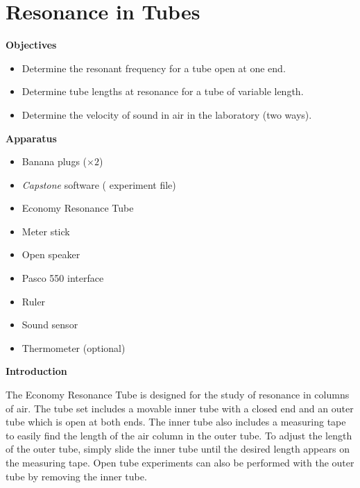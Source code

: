 \section{Resonance in Tubes} 



\makelabheader %

\bigskip

\textbf{Objectives}
\begin{itemize}[nosep]
\item Determine the resonant frequency for a tube open at one end.

\item Determine tube lengths at resonance for a tube of variable length.

\item Determine the velocity of sound in air in the laboratory (two ways).

\end{itemize}

\bigskip
\textbf{Apparatus} 
\begin{itemize}[nosep]
\item Banana plugs ($\times 2$)
\item \textit{Capstone} software ( experiment file)
\item Economy Resonance Tube 
\item Meter stick
\item Open speaker
\item Pasco 550 interface
\item Ruler
\item Sound sensor
\item Thermometer (optional)
\end{itemize}
\bigskip
\textbf{Introduction} 

The Economy Resonance Tube is designed for the study of resonance in columns of air.  The tube set includes a movable inner tube with a closed end and an outer tube which is open at both ends.  The inner tube also includes a measuring tape to easily find the length of the air column in the outer tube.  To adjust the length of the outer tube, simply slide the inner tube until the desired length appears on the measuring tape.  Open tube experiments can also be performed with the outer tube by removing the inner tube.

